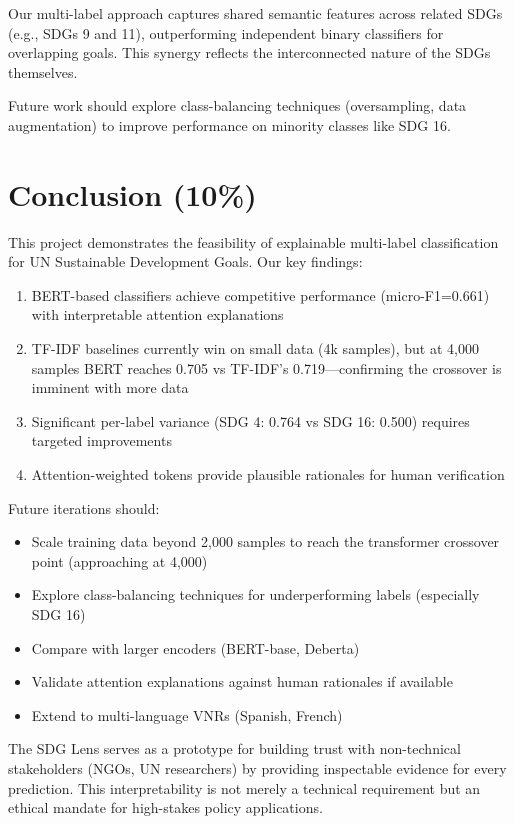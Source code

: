 \documentclass[12pt,a4paper]{article}
\begin{document}
Our multi-label approach captures shared semantic features across related SDGs (e.g., SDGs 9 and 11), outperforming independent binary classifiers for overlapping goals. This synergy reflects the interconnected nature of the SDGs themselves.

Future work should explore class-balancing techniques (oversampling, data augmentation) to improve performance on minority classes like SDG 16.

\section{Conclusion (10\%)}

This project demonstrates the feasibility of explainable multi-label classification for UN Sustainable Development Goals. Our key findings:

\begin{enumerate}
    \item BERT-based classifiers achieve competitive performance (micro-F1=0.661) with interpretable attention explanations
    \item TF-IDF baselines currently win on small data (4k samples), but at 4,000 samples BERT reaches 0.705 vs TF-IDF's 0.719—confirming the crossover is imminent with more data
    \item Significant per-label variance (SDG 4: 0.764 vs SDG 16: 0.500) requires targeted improvements
    \item Attention-weighted tokens provide plausible rationales for human verification
\end{enumerate}

Future iterations should:
\begin{itemize}
    \item Scale training data beyond 2,000 samples to reach the transformer crossover point (approaching at 4,000)
    \item Explore class-balancing techniques for underperforming labels (especially SDG 16)
    \item Compare with larger encoders (BERT-base, Deberta)
    \item Validate attention explanations against human rationales if available
    \item Extend to multi-language VNRs (Spanish, French)
\end{itemize}

The SDG Lens serves as a prototype for building trust with non-technical stakeholders (NGOs, UN researchers) by providing inspectable evidence for every prediction. This interpretability is not merely a technical requirement but an ethical mandate for high-stakes policy applications.
\end{document}

